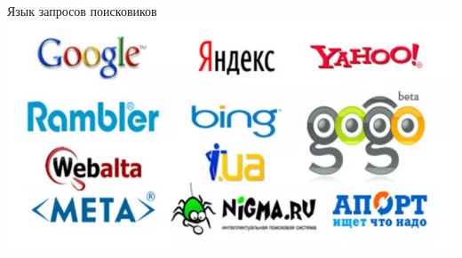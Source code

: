 \documentclass[10pt,pdf,hyperref={unicode}]{beamer}%
\begin{document}
\begin{frame}{Язык запросов поисковиков}
  \includegraphics[width=\textwidth]{search.png}
\end{frame}
\end{document}
